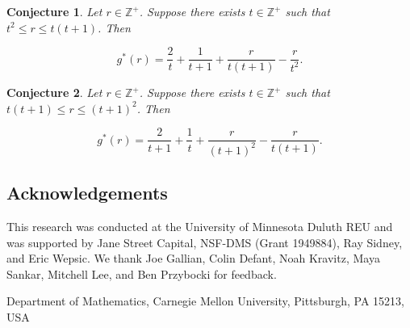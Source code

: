 \documentclass{article}
\newtheorem{conjecture}{Conjecture}
\begin{document}
\begin{conjecture}
Let $r \in \mathbb{Z}^{+}$. Suppose there exists $t \in \mathbb{Z}^{+}$ such that $t^2 \leq r \leq t(t+1)$. Then

$$g^*(r) =  \frac{2}{t} + \frac{1}{t+1} + \frac{r}{t(t+1)} - \frac{r}{t^2}.$$
\end{conjecture}

\begin{conjecture}
Let $r \in \mathbb{Z}^{+}$. Suppose there exists $t \in \mathbb{Z}^{+}$ such that $t(t+1) \leq r \leq (t+1)^2$. Then

$$g^*(r) = \frac{2}{t+1}+\frac{1}{t}+\frac{r}{(t+1)^2}-\frac{r}{t(t+1)}.$$
\end{conjecture}

\begin{center}
\section{Acknowledgements}
\end{center}

This research was conducted at the University of Minnesota Duluth REU and was supported by Jane Street Capital, NSF-DMS (Grant 1949884), Ray Sidney, and Eric Wepsic. We thank Joe Gallian, Colin Defant, Noah Kravitz, Maya Sankar, Mitchell Lee, and Ben Przybocki for feedback.  






\noindent
Department of Mathematics, Carnegie Mellon University, Pittsburgh, PA 15213, USA 
\end{document}
